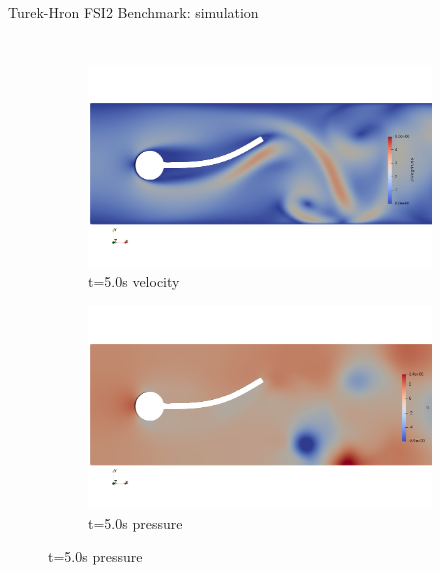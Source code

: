 \documentclass[10pt,t]{beamer}
\begin{document}
\begin{frame}{Turek-Hron FSI2 Benchmark: simulation}

\begin{columns}


\begin{figure}[htb]
\vspace*{-0.8cm}
\centering %
\begin{subfigure}{0.5\textwidth}
  \includegraphics[width=\linewidth, trim=0 120 0 120, clip]{images/FSI2/fsi2_v1.png}
  \caption{t=5.0s velocity}
  \label{fig:fsi2_v1}
\end{subfigure}\hfil %
\begin{subfigure}{0.5\textwidth}
  \includegraphics[width=\linewidth, trim=0 120 0 120, clip]{images/FSI2/fsi2_p1.png}
  \caption{t=5.0s pressure}
  \label{fig:fsi2_p1}
\end{subfigure}\hfil %

\medskip


\end{figure}
\end{columns}
\end{frame}
\end{document}
